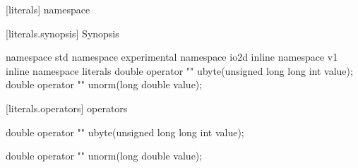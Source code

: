  [literals] { namespace}

 [literals.synopsis] { Synopsis}

\begin{codeblock}
namespace std { namespace experimental { namespace io2d { inline namespace v1 {
  inline namespace literals {
    double operator "" ubyte(unsigned long long int value);
    double operator "" unorm(long double value);
  }
} } } }
\end{codeblock}

 [literals.operators] { operators}

%
%
\begin{itemdecl}
double operator "" ubyte(unsigned long long int value);
\end{itemdecl}
\begin{itemdescr}
	\pnum
	\returns
\end{itemdescr}

%
%
\begin{itemdecl}
double operator "" unorm(long double value);
\end{itemdecl}
\begin{itemdescr}
	\pnum
	\returns
\end{itemdescr}
